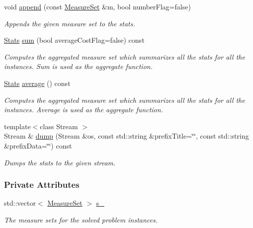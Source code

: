 \begin{DoxyCompactItemize}
void \hyperlink{structslb_1_1core_1_1sb_1_1Stats_a6f3547c886c2cfbcecb1ee89ab40049e}{append} (const \hyperlink{structslb_1_1core_1_1sb_1_1MeasureSet}{Measure\+Set} \&m, bool number\+Flag=false)
\begin{DoxyCompactList}\small\item\em Appends the given measure set to the stats. \end{DoxyCompactList}\item 
\hyperlink{structslb_1_1core_1_1sb_1_1Stats}{Stats} \hyperlink{structslb_1_1core_1_1sb_1_1Stats_a5736f81cc384dd09788dab5eb73567a3}{sum} (bool average\+Cost\+Flag=false) const 
\begin{DoxyCompactList}\small\item\em Computes the aggregated measure set which summarizes all the stats for all the instances. Sum is used as the aggregate function. \end{DoxyCompactList}\item 
\hyperlink{structslb_1_1core_1_1sb_1_1Stats}{Stats} \hyperlink{structslb_1_1core_1_1sb_1_1Stats_a1f31c69e821d4eb091558838dc52ceb7}{average} () const 
\begin{DoxyCompactList}\small\item\em Computes the aggregated measure set which summarizes all the stats for all the instances. Average is used as the aggregate function. \end{DoxyCompactList}\item 
{\footnotesize template$<$class Stream $>$ }\\Stream \& \hyperlink{structslb_1_1core_1_1sb_1_1Stats_a9592f5f610468d521b137791a149e549}{dump} (Stream \&os, const std\+::string \&prefix\+Title=\char`\"{}\char`\"{}, const std\+::string \&prefix\+Data=\char`\"{}\char`\"{}) const 
\begin{DoxyCompactList}\small\item\em Dumps the stats to the given stream. \end{DoxyCompactList}\end{DoxyCompactItemize}
\subsubsection*{Private Attributes}
\begin{DoxyCompactItemize}
\item 
std\+::vector$<$ \hyperlink{structslb_1_1core_1_1sb_1_1MeasureSet}{Measure\+Set} $>$ \hyperlink{structslb_1_1core_1_1sb_1_1Stats_a7cbbef603f218f88764b8b56810a1bde}{s\+\_\+}\hypertarget{structslb_1_1core_1_1sb_1_1Stats_a7cbbef603f218f88764b8b56810a1bde}{}\label{structslb_1_1core_1_1sb_1_1Stats_a7cbbef603f218f88764b8b56810a1bde}

\begin{DoxyCompactList}\small\item\em The measure sets for the solved problem instances. \end{DoxyCompactList}\end{DoxyCompactItemize}


